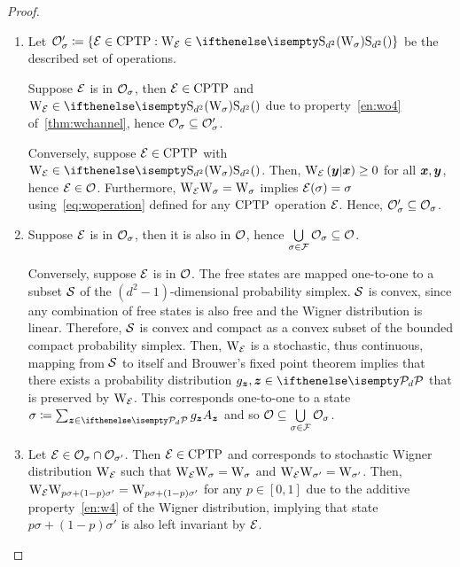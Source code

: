 \begin{proof}
    \begin{enumerate}
    \item Let $\O_\sigma' \coloneqq \{ \E \in \cptp: \W{\E} \in \stochw \}$ be the described set of operations.
    
    Suppose $\E$ is in $\O_\sigma$, then $\E \in \cptp$ and $\W{\E} \in \stochw$ due to property~\ref{en:wo4} of~\cref{thm:wchannel}, hence $\O_\sigma \subseteq \O_\sigma'$.
    
    Conversely, suppose $\E \in \cptp$ with $\W{\E} \in \stochw$. 
    Then, $\W[\bmy|\bmx]{\E} \geq 0$ for all $\bmx, \bmy$, hence $\E \in \O$.
    Furthermore, $\W{\E} \W{\sigma} = \W{\sigma}$ implies $\E(\sigma) = \sigma$ using~\cref{eq:woperation} defined for any $\cptp$ operation $\E$.
    Hence, $\O_\sigma' \subseteq \O_\sigma$.
    
    \item Suppose $\E$ is in $\O_\sigma$, then it is also in $\O$, hence $\bigcup\limits_{\sigma \in \F} \O_\sigma \subseteq \O$.
    
    Conversely, suppose $\E$ is in $\O$. 
    The free states are mapped one-to-one to a subset $\cal{S}$ of the $(d^2 - 1)$-dimensional probability simplex.
    $\cal{S}$ is convex, since any combination of free states is also free and the Wigner distribution is linear.
    Therefore, $\cal{S}$ is convex and compact as a convex subset of the bounded compact probability simplex.
    Then, $\W{\E}{}$ is a stochastic, thus continuous, mapping from $\cal{S}$ to itself and Brouwer's fixed point theorem  implies that there exists a probability distribution $g_{\bmz}, \bmz \in \pd$ that is preserved by $\W{\E}{}$.
    This corresponds one-to-one to a state $\sigma \coloneqq \sum_{\bmz \in \pd} g_{\bmz} A_{\bmz}$ and so $\O \subseteq \bigcup\limits_{\sigma \in \F} \O_\sigma$.
    
    \item Let $\E \in \O_{\sigma} \cap \O_{\sigma'}$.
    Then $\E \in \cptp$ and corresponds to stochastic Wigner distribution $\W{\E}$ such that $\W{\E} \W{\sigma} = \W{\sigma}$ and $\W{\E} \W{\sigma'} = \W{\sigma'}$.
    Then, $\W{\E} \W{p\sigma + (1-p)\sigma'} = \W{p\sigma + (1-p)\sigma'}$ for any $p \in [0,1]$ due to the additive property~\ref{en:w4} of the Wigner distribution, implying that state $p\sigma + (1-p)\sigma'$ is also left invariant by $\E$.
    \end{enumerate}
\end{proof}

